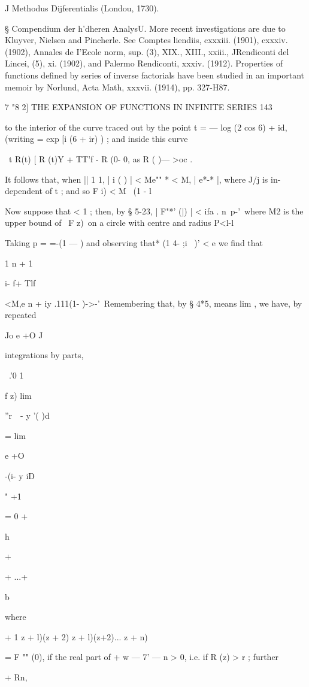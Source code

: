 {J Methodus Dijferentialis (Londou, 1730).

§ Compendium der h'dheren AnalysU. More recent investigations are due
to Kluyver, Nielsen and Pincherle. See Comptes liendiis, cxxxiii.
(1901), cxxxiv. (1902), Annales de I'Ecole norm, sup. (3), XIX.,
XIII., xxiii., JRendiconti del Lincei, (5), xi. (1902), and Palermo
Rendiconti, xxxiv. (1912). Properties of functions defined by series
of inverse factorials have been studied in an important memoir by
Norlund, Acta Math, xxxvii. (1914), pp. 327-H87.

7 "8 2] THE EXPANSION OF FUNCTIONS IN INFINITE SERIES 143

to the interior of the curve traced out by the point t = — log (2 cos
6) + id, (writing = exp [i (6 + ir) ) ; and inside this curve

\ t R(t) [ R (t)Y + TT'f - R (0- 0, as R ( )— >oc .

It follows that, when || 1 1, | i ( ) | < Me"" * < M, | e*-* |, where
J/j is in- dependent of t ; and so F i) < M \ (1 - l

Now suppose that < 1 ; then, by § 5-23, | F"*' (|) | < ifa . n\ p-'\
where M2 is the upper bound of \ F z)\ on a circle with centre and
radius P<l-l

Taking p = =-(1 — ) and observing that* (1 4- ;i~ )' < e we find that

1 n + 1

i- f+ Tlf

<M,e n + iy .111(1- )->-'\ Remembering that, by § 4*5, means lim , we
have, by repeated

Jo e +O J

integrations by parts,

\ .'0 1

f z) lim

''r\ \ - y '( )d

= lim

e +O

-(i- y iD

" +1

= 0 +

h

+

+ ...+

b

where

+ 1 z + l)(z + 2) z + l)(z+2)... z + n)

= F "" (0), if the real part of + w — 7' — n > 0, i.e. if R (z) > r ;
further

+ Rn,

}
